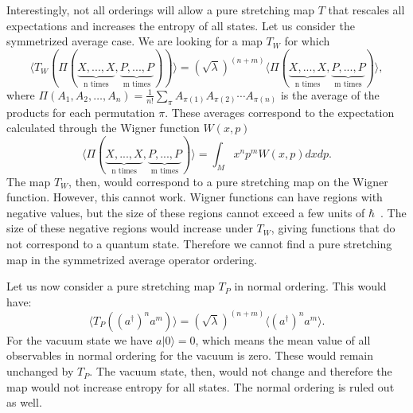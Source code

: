 \documentclass{article}
\begin{document}
Interestingly, not all orderings will allow a pure stretching map $T$ that rescales all expectations and increases the entropy of all states. Let us consider the symmetrized average case. We are looking for a map $T_W$ for which
\begin{equation}
\langle T_W(\Pi(\underbrace{X, ..., X}_{\text{n times}}, \underbrace{P, ..., P}_{\text{m times}})) \rangle = (\sqrt{\lambda})^{(n+m)} \langle \Pi(\underbrace{X, ..., X}_{\text{n times}}, \underbrace{P, ..., P}_{\text{m times}})\rangle,
\end{equation}
where $\Pi(A_1, A_2, \ldots, A_n)  = \frac{1}{n!} \sum_{\pi}  A_{\pi(1)} A_{\pi(2)} \cdots A_{\pi(n)}$ is the average of the products for each permutation $\pi$. These averages correspond to the expectation calculated through the Wigner function $W(x,p)$
\begin{equation}
     \langle \Pi(\underbrace{X, ..., X}_{\text{n times}}, \underbrace{P, ..., P}_{\text{m times}})\rangle = \int_M x^n p^m W(x, p) dx dp.
\end{equation}
The map $T_W$, then, would correspond to a pure stretching map on the Wigner function. However, this cannot work. Wigner functions can have regions with negative values, but the size of these regions cannot exceed a few units of $\hbar$~\cite{kenfack2004negativity}. The size of these negative regions would increase under $T_W$, giving functions that do not correspond to a quantum state. Therefore we cannot find a pure stretching map in the symmetrized average operator ordering.

Let us now consider a pure stretching map $T_P$ in normal ordering. This would have:
\begin{equation}
\langle T_P((a^\dagger)^n a^m) \rangle = (\sqrt{\lambda})^{(n+m)} \langle (a^\dagger)^n a^m \rangle.
\end{equation}
For the vacuum state we have $a|0\rangle=0$, which means the mean value of all observables in normal ordering for the vacuum is zero. These would remain unchanged by $T_P$. The vacuum state, then, would not change and therefore the map would not increase entropy for all states. The normal ordering is ruled out as well.
\end{document}
